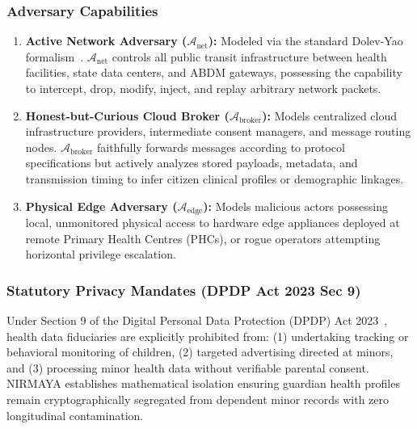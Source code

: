 \documentclass[journal,twocolumn]{IEEEtran}
\begin{document}
\subsubsection{Adversary Capabilities}
\begin{enumerate}
    \item \textbf{Active Network Adversary ($\mathcal{A}_{\text{net}}$):} Modeled via the standard Dolev-Yao formalism~\cite{dolev_yao,owasp_asvs}. $\mathcal{A}_{\text{net}}$ controls all public transit infrastructure between health facilities, state data centers, and ABDM gateways, possessing the capability to intercept, drop, modify, inject, and replay arbitrary network packets.
    \item \textbf{Honest-but-Curious Cloud Broker ($\mathcal{A}_{\text{broker}}$):} Models centralized cloud infrastructure providers, intermediate consent managers, and message routing nodes. $\mathcal{A}_{\text{broker}}$ faithfully forwards messages according to protocol specifications but actively analyzes stored payloads, metadata, and transmission timing to infer citizen clinical profiles or demographic linkages.
    \item \textbf{Physical Edge Adversary ($\mathcal{A}_{\text{edge}}$):} Models malicious actors possessing local, unmonitored physical access to hardware edge appliances deployed at remote Primary Health Centres (PHCs), or rogue operators attempting horizontal privilege escalation.
\end{enumerate}

\subsubsection{Statutory Privacy Mandates (DPDP Act 2023 Sec 9)}
Under Section 9 of the Digital Personal Data Protection (DPDP) Act 2023~\cite{dpdp_act_2023}, health data fiduciaries are explicitly prohibited from: (1) undertaking tracking or behavioral monitoring of children, (2) targeted advertising directed at minors, and (3) processing minor health data without verifiable parental consent. NIRMAYA establishes mathematical isolation ensuring guardian health profiles remain cryptographically segregated from dependent minor records with zero longitudinal contamination.
\end{document}

